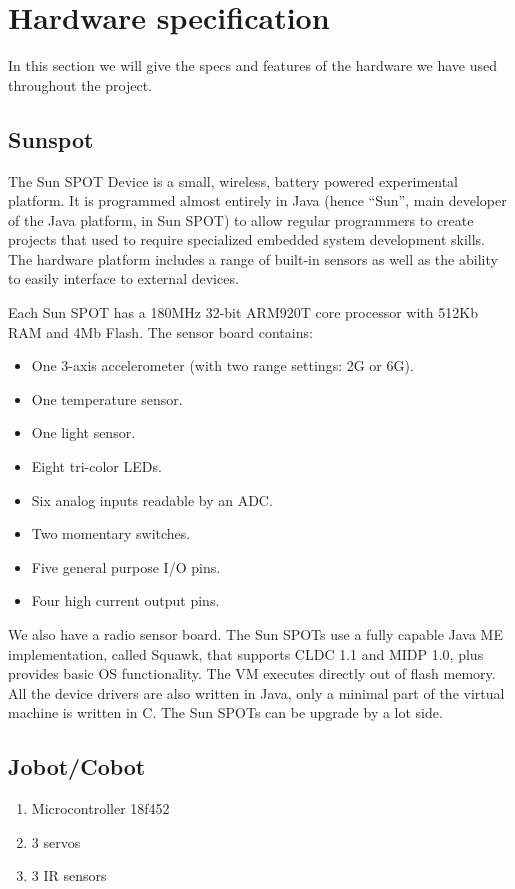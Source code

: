\documentclass[a4paper,10pt]{article} %
\begin{document}

\appendix

\section{Hardware specification} %
\label{app:hardware}

In this section we will give the specs and features of the hardware we have used
throughout the project.

\subsection{Sunspot} %
\label{app:sunspot}

The Sun SPOT Device is a small, wireless, battery powered experimental platform.
It is programmed almost entirely in Java (hence ``Sun'', main developer of the
Java platform, in Sun SPOT) to allow regular programmers to create projects that
used to require specialized embedded system development skills. The hardware
platform includes a range of built-in sensors as well as the ability to easily
interface to external devices.

Each Sun SPOT has a 180MHz 32-bit ARM920T core processor with 512Kb RAM and 4Mb
Flash. The sensor board contains:

\begin{itemize}
    \item One 3-axis accelerometer (with two range settings: 2G or 6G).
    \item One temperature sensor.
    \item One light sensor.
    \item Eight tri-color LEDs.
    \item Six analog inputs readable by an ADC.
    \item Two momentary switches.
    \item Five general purpose I/O pins.
    \item Four high current output pins.
\end{itemize}

We also have a radio sensor board. The Sun SPOTs use a fully capable Java ME
implementation, called Squawk, that supports CLDC 1.1 and MIDP 1.0, plus
provides basic OS functionality. The VM executes directly out of flash memory.
All the device drivers are also written in Java, only a minimal part of the
virtual machine is written in C. The Sun SPOTs can be upgrade by a lot side.


\subsection{Jobot/Cobot} %
\label{app:cobot}

\begin{enumerate}
	\item Microcontroller 18f452
	\item 3 servos
	\item 3 IR sensors
\end{enumerate}





\end{document}
